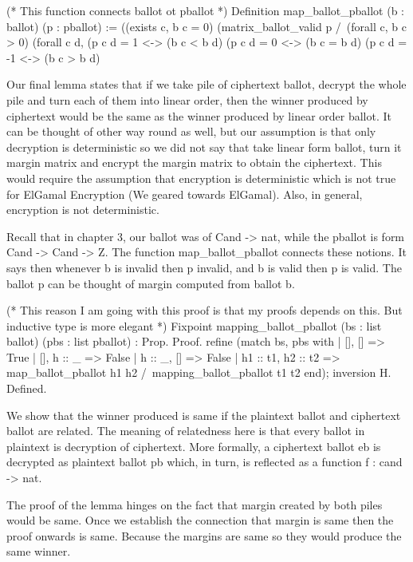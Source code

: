 (* This function connects ballot ot pballot *)
    Definition map_ballot_pballot (b : ballot) (p : pballot) :=
      ((exists c,  b c = 0)%
      (matrix_ballot_valid p /\ (forall c, b c > 0)%
       (forall c d, (p c d = 1 <-> (b c < b d)%
               (p c d = 0 <-> (b c = b d)%
               (p c d = -1 <-> (b c > b d)%
               
 Our final lemma states that if we take pile of ciphertext ballot, decrypt the whole pile and turn each of 
 them into linear order, then the winner produced by ciphertext would be the same as the winner produced 
 by linear order ballot. It can be thought of other way round as well, but our assumption is that 
 only decryption is deterministic so we did not say that take linear form ballot, turn it margin 
 matrix and encrypt the margin matrix to obtain the ciphertext. This would require the assumption that 
 encryption is deterministic which is not true for ElGamal Encryption (We geared towards ElGamal). 
 Also, in general, encryption is not deterministic. 
 
 
    
Recall that in chapter 3, our ballot was of Cand -> nat, while the pballot is form Cand -> Cand -> Z. 
The function map_ballot_pballot connects these notions. It says then whenever b is invalid then p invalid, 
and b is valid then p is valid. The ballot p can be thought of margin computed from ballot b. 
    
    (* This reason I am going with this proof is that my proofs depends on this. 
       But inductive type is more elegant *)
    Fixpoint mapping_ballot_pballot (bs : list ballot) (pbs : list pballot) : Prop. 
    Proof.
      refine (match bs, pbs with
              | [], [] => True
              | [], h :: _ => False 
              | h :: _, [] => False
              | h1 :: t1, h2 :: t2 =>
                map_ballot_pballot h1 h2 /\
                 mapping_ballot_pballot t1 t2
              end); inversion H.
    Defined.
    
 
We show that the winner produced is same if the plaintext ballot and ciphertext ballot are related.  The meaning 
of relatedness here is that every ballot in plaintext is decryption of ciphertext. More formally, a ciphertext ballot 
eb is decrypted as plaintext ballot pb which, in turn, is reflected as a function f : cand -> nat. 

The proof of the lemma hinges on the fact that margin created by both piles would be same.  Once we establish 
the connection that margin is same then the proof onwards is same. Because the margins are same so they would produce the 
same winner. 

